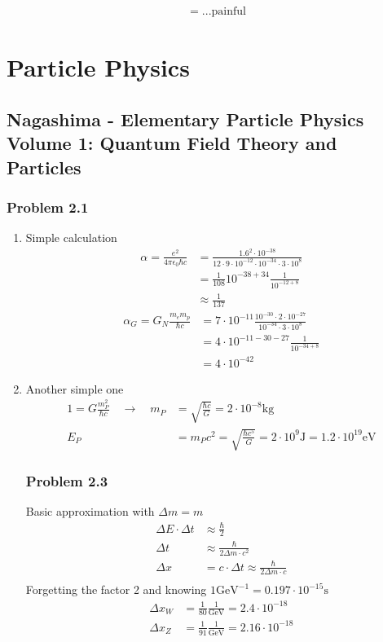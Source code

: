 \documentclass[10pt,a4paper]{article}
\theoremstyle{definition}
\begin{document}
\begin{align}
[M_{\mu\nu},M_{\rho,\sigma}]
&=...\text{painful}
\end{align}

\newpage
\section{Particle Physics}
\subsection{{\sc Nagashima} - Elementary Particle Physics Volume 1: Quantum Field Theory and Particles}
\subsubsection{Problem 2.1}
\begin{enumerate}
\item Simple calculation
\begin{align}
\alpha=\frac{e^2}{4\pi\epsilon_0\hbar c}&=\frac{1.6^2\cdot 10^{-38}}{12\cdot 9\cdot 10^{-12}\cdot 10^{-34}\cdot3\cdot10^8}\\
&=\frac{1}{108}10^{-38+34}\frac{1}{10^{-12+8}}\\
&\approx\frac{1}{137}
\end{align}
\begin{align}
\alpha_G=G_N\frac{m_em_p}{\hbar c}&=7\cdot10^{-11}\frac{10^{-30}\cdot2\cdot10^{-27}}{10^{-34}\cdot3\cdot10^8}\\
&=4\cdot10^{-11-30-27}\frac{1}{10^{-34+8}}\\
&=4\cdot10^{-42}
\end{align}
\item Another simple one
\begin{align}
1=G\frac{m_P^2}{\hbar c}\quad\rightarrow\quad m_P&=\sqrt{\frac{\hbar c}{G}}=2\cdot10^{-8}\text{kg}\\
E_P&=m_Pc^2=\sqrt{\frac{\hbar c^5}{G}}=2\cdot10^9\text{J}=1.2\cdot10^{19}\text{eV}
\end{align}

\subsubsection{Problem 2.3}
Basic approximation with $\Delta m = m$
\begin{align}
\Delta E\cdot\Delta t&\approx\frac{\hbar}{2}\\
\Delta t&\approx\frac{\hbar}{2\Delta m\cdot c^2}\\
\Delta x&=c\cdot\Delta t\approx\frac{\hbar}{2\Delta m\cdot c}\\
\end{align}
Forgetting the factor 2 and knowing $1\text{GeV}^{-1}= 0.197\cdot10^{-15}\text{s}$
\begin{align}
\Delta x_W&=\frac{1}{80}\frac{1}{\text{GeV}}=2.4\cdot10^{-18}\\
\Delta x_Z&=\frac{1}{91}\frac{1}{\text{GeV}}=2.16\cdot10^{-18}
\end{align}
\end{enumerate}
\end{document}
